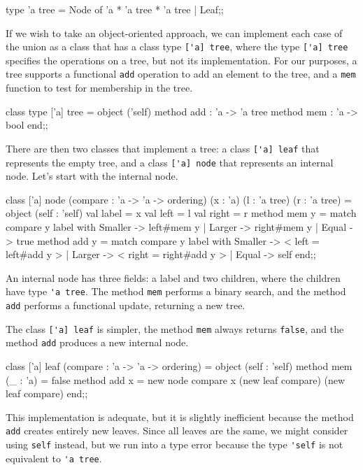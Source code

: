 \begin{ocaml}
type 'a tree =
   Node of 'a * 'a tree * 'a tree
 | Leaf;;
\end{ocaml}
%
If we wish to take an object-oriented approach, we can implement each
case of the union as a class that has a class type
\hbox{\lstinline$['a] tree$}, where the type \hbox{\lstinline$['a] tree$}
specifies the operations on a tree, but not its implementation.  For
our purposes, a tree supports a functional \hbox{\lstinline$add$} operation
to add an element to the tree, and a \hbox{\lstinline$mem$} function to test
for membership in the tree.

\begin{ocaml}
class type ['a] tree =
  object ('self)
    method add : 'a -> 'a tree
    method mem : 'a -> bool
  end;;
\end{ocaml}
%
\label{page:poly-tree}
There are then two classes that implement a tree: a 
class \hbox{\lstinline$['a] leaf$} 
that represents the empty tree, and a
class \hbox{\lstinline$['a] node$}
that represents an internal node.  Let's start with the internal
node.

\begin{ocaml}
class ['a] node (compare : 'a -> 'a -> ordering)
    (x : 'a) (l : 'a tree) (r : 'a tree) =
  object (self : 'self)
    val label = x
    val left = l
    val right = r
    method mem y =
      match compare y label with
         Smaller -> left#mem y
       | Larger -> right#mem y
       | Equal -> true
    method add y =
      match compare y label with
         Smaller -> {< left = left#add y >}
       | Larger -> {< right = right#add y >}
       | Equal -> self
  end;;
\end{ocaml}
%
An internal node has three fields: a label and two children, where the
children have type \hbox{\lstinline$'a tree$}.  The method \hbox{\lstinline$mem$}
performs a binary search, and the method \hbox{\lstinline$add$} performs a
functional update, returning a new tree.

The class \hbox{\lstinline$['a] leaf$} is simpler, the method \hbox{\lstinline$mem$}
always returns \hbox{\lstinline$false$}, and the method \hbox{\lstinline$add$}
produces a new internal node.

\begin{ocaml}
class ['a] leaf (compare : 'a -> 'a -> ordering) =
  object (self : 'self)
    method mem (_ : 'a) = false
    method add x =
      new node compare x (new leaf compare) (new leaf compare)
  end;;
\end{ocaml}
%
This implementation is adequate, but it is slightly inefficient because
the method \hbox{\lstinline$add$} creates entirely new leaves.  Since all
leaves are the same, we might consider using \hbox{\lstinline$self$} instead,
but we run into a type error because the type \hbox{\lstinline$'self$} is not
equivalent to \hbox{\lstinline$'a tree$}.


